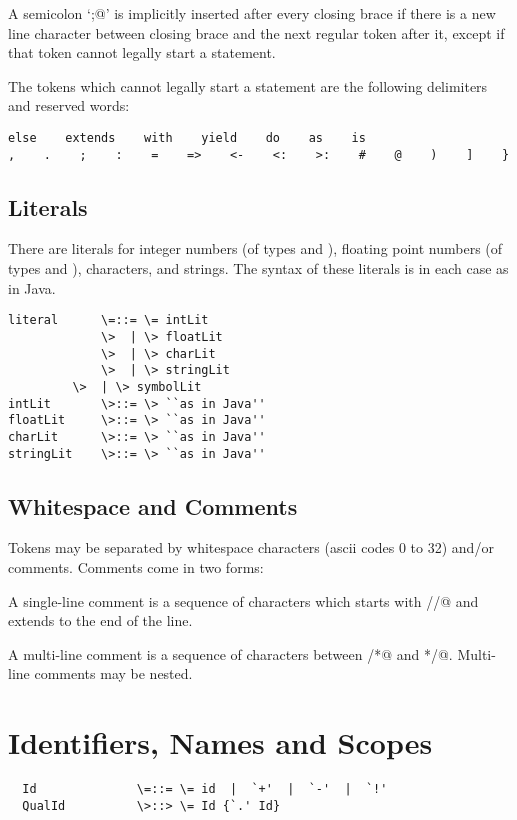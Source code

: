 \documentclass[11pt]{report}
\begin{document}
A semicolon `\verb@;@' is implicitly inserted after every closing brace
if there is a new line character between closing brace and the next
regular token after it, except if that token cannot legally start a
statement.

The tokens which cannot legally start a statement
are the following delimiters and reserved words:
\begin{verbatim}
else    extends    with    yield    do    as    is
,    .    ;    :    =    =>    <-    <:    >:    #    @    )    ]    }
\end{verbatim}

\section{Literals}

There are literals for integer numbers (of types \verb@Int@ and \verb@Long@),
floating point numbers (of types \verb@Float@ and \verb@Double@), characters, and
strings.  The syntax of these literals is in each case as in Java.

\syntax\begin{verbatim}
literal      \=::= \= intLit
             \>  | \> floatLit
             \>  | \> charLit
             \>  | \> stringLit
	     \>  | \> symbolLit
intLit       \>::= \> ``as in Java''
floatLit     \>::= \> ``as in Java''
charLit      \>::= \> ``as in Java''
stringLit    \>::= \> ``as in Java''
\end{verbatim}

\section{Whitespace and Comments}

Tokens may be separated by whitespace characters (ascii codes 0 to 32)
and/or comments. Comments come in two forms:

A single-line comment is a sequence of characters which starts with
\verb@//@ and extends to the end of the line.

A multi-line comment is a sequence of characters between \verb@/*@ and
\verb@*/@. Multi-line comments may be nested.


\chapter{\label{sec:names}Identifiers, Names and Scopes}

\syntax\begin{verbatim}
  Id              \=::= \= id  |  `+'  |  `-'  |  `!'
  QualId          \>::> \= Id {`.' Id}
\end{verbatim}
\end{document}
